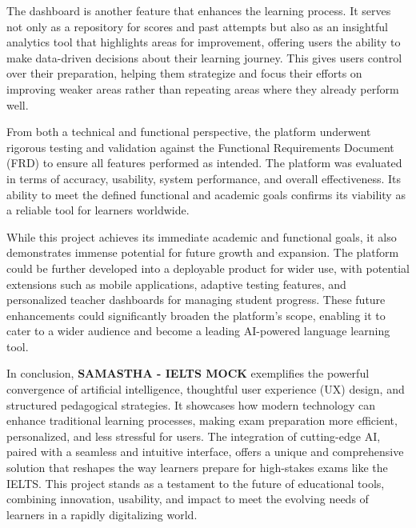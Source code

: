 \documentclass[a4paper,12pt]{article}
\begin{document}
\vspace{0.3cm}

The dashboard is another feature that enhances the learning process. It serves not only as a repository for scores and past attempts but also as an insightful analytics tool that highlights areas for improvement, offering users the ability to make data-driven decisions about their learning journey. This gives users control over their preparation, helping them strategize and focus their efforts on improving weaker areas rather than repeating areas where they already perform well.

\vspace{0.3cm}

From both a technical and functional perspective, the platform underwent rigorous testing and validation against the Functional Requirements Document (FRD) to ensure all features performed as intended. The platform was evaluated in terms of accuracy, usability, system performance, and overall effectiveness. Its ability to meet the defined functional and academic goals confirms its viability as a reliable tool for learners worldwide.

\vspace{0.3cm}

While this project achieves its immediate academic and functional goals, it also demonstrates immense potential for future growth and expansion. The platform could be further developed into a deployable product for wider use, with potential extensions such as mobile applications, adaptive testing features, and personalized teacher dashboards for managing student progress. These future enhancements could significantly broaden the platform’s scope, enabling it to cater to a wider audience and become a leading AI-powered language learning tool.

\vspace{0.3cm}

In conclusion, \textbf{SAMASTHA - IELTS MOCK} exemplifies the powerful convergence of artificial intelligence, thoughtful user experience (UX) design, and structured pedagogical strategies. It showcases how modern technology can enhance traditional learning processes, making exam preparation more efficient, personalized, and less stressful for users. The integration of cutting-edge AI, paired with a seamless and intuitive interface, offers a unique and comprehensive solution that reshapes the way learners prepare for high-stakes exams like the IELTS. This project stands as a testament to the future of educational tools, combining innovation, usability, and impact to meet the evolving needs of learners in a rapidly digitalizing world.
\end{document}
